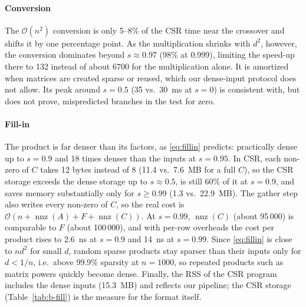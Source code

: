 \documentclass[conference,a4paper]{IEEEtran}
\newcommand{\bigO}[1]{\mathcal{O}\!\left(#1\right)}
\newcommand{\nnz}{\operatorname{nnz}}
\begin{document}
\paragraph{Conversion} The $\bigO{n^2}$ conversion is only 5--8\% of the CSR
time near the crossover and shifts it by one percentage point. As the
multiplication shrinks with $d^2$, however, the conversion dominates beyond
$s \approx 0.97$ (98\% at 0.999), limiting the speed-up there to 132 instead
of about 6700 for the multiplication alone. It is amortized when matrices are
created sparse or reused, which our dense-input protocol does not allow. Its
peak around $s = 0.5$ (35 vs.\ 30~ms at $s = 0$) is consistent with, but does
not prove, mispredicted branches in the test for zero.

\paragraph{Fill-in} The product is far denser than its factors, as
\eqref{eq:fillin} predicts: practically dense up to $s = 0.9$ and 18 times
denser than the inputs at $s = 0.95$. In CSR, each non-zero of $C$ takes 12
bytes instead of 8 (11.4 vs.\ 7.6~MB for a full $C$), so the CSR storage
exceeds the dense storage up to $s \approx 0.5$, is still 60\% of it at
$s = 0.9$, and saves memory substantially only for $s \ge 0.99$ (1.3 vs.\
22.9~MB). The gather step also writes every non-zero of $C$, so the real cost
is $\bigO{n + \nnz(A) + F + \nnz(C)}$. At $s = 0.99$, $\nnz(C)$ (about
95\,000) is comparable to $F$ (about 100\,000), and with per-row overheads the
cost per product rises to 2.6~ns at $s = 0.9$ and 14~ns at $s = 0.99$. Since
\eqref{eq:fillin} is close to $n d^2$ for small $d$, random sparse products
stay sparser than their inputs only for $d < 1/n$, i.e.\ above 99.9\% sparsity
at $n = 1000$, so repeated products such as matrix powers quickly become dense.
Finally, the RSS of the CSR program includes the dense inputs (15.3~MB) and
reflects our pipeline; the CSR storage (Table~\ref{tab:b-fill}) is the measure
for the format itself.
\end{document}
